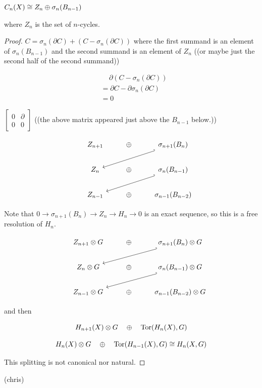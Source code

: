 \documentclass[11pt,leqno,oneside]{amsart}
\newenvironment{dateenv}{
  \vspace{1em}
}{
  \vspace{1em}
}
\newcommand{\mydate}[4]{
  \newdate{#1}{#2}{#3}{#4}
  \begin{dateenv}
    \hfill\displaydate{#1}
  \end{dateenv}
}
\numberwithin{thm}{section}
\renewcommand{\d}{\partial}
\newcommand{\homl}[1][n]{H_{#1}}
\begin{document}
\begin{lem}
  $C_n(X) \mathrel{\cong} Z_n \oplus \sigma_n(B_{n-1})$

  where $Z_n$ is the set of $n$-cycles.
\end{lem}
\begin{proof}
  $C = \sigma_n(\d C) + (C - \sigma_n(\d C))$
  where the first summand is an element of $\sigma_n(B_{n-1})$ and the second summand is an element of $Z_n$ ((or maybe just the second half of the second summand))

  \begin{align}
    &\quad\, \d(C - \sigma_n(\d C)) \\
    &= \d C - \d\sigma_n(\d C) \\
    &= 0
  \end{align}

  $\begin{bmatrix}
    0 & \d \\
    0 & 0
  \end{bmatrix}$
  ((the above matrix appeared just above the $B_{n-1}$ below.))

  $$\begin{tikzcd}
    &Z_{n+1} &\dsum &\sigma_{n+1}(B_n) \arrow[lld, hook', ""] \\
    &Z_{n} &\dsum &\sigma_{n}(B_{n-1}) \arrow[lld, hook', ""] \\
    &Z_{n-1} &\dsum &\sigma_{n-1}(B_{n-2})
  \end{tikzcd}$$

  Note that $0 \to \sigma_{n+1}(B_n) \to Z_n \to \homl \to 0$ is an exact sequence, so this is a free resolution of $\homl$.

  $$\begin{tikzcd}
    &Z_{n+1} \tprod G &\dsum &\sigma_{n+1}(B_n) \tprod G \arrow[lld, hook', ""] \\
    &Z_{n} \tprod G &\dsum &\sigma_{n}(B_{n-1}) \tprod G \arrow[lld, hook', ""] \\
    &Z_{n-1} \tprod G &\dsum &\sigma_{n-1}(B_{n-2}) \tprod G
  \end{tikzcd}$$

  and then

  $$H_{n+1}(X) \tprod G \quad\dsum\quad \Tor(\homl(X), G)$$

  $$H_{n}(X) \tprod G \quad\dsum\quad \Tor(\homl[n-1](X), G) \isom \homl(X, G)$$

  This splitting is not canonical nor natural.
\end{proof}

\mydate{dl}{19}{4}{2017}
(chris)
\end{document}
